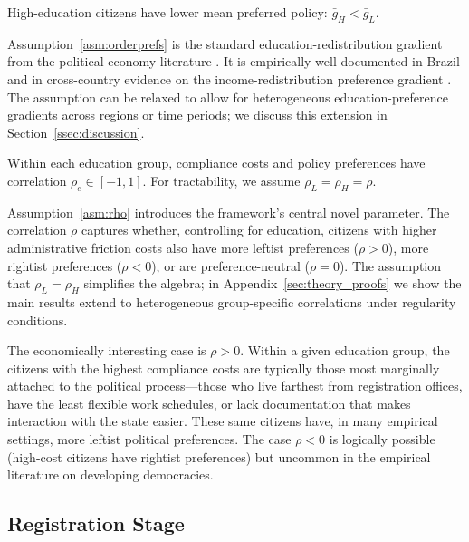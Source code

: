 \begin{assumption}
\label{asm:orderprefs}
High-education citizens have lower mean preferred policy: $\bar g_H < \bar g_L$.
\end{assumption}

Assumption~\ref{asm:orderprefs} is the standard education-redistribution gradient from the political economy literature \citep{Meltzer1981RationalTheoryThe}. It is empirically well-documented in Brazil \citep{Hunter2010, Soares2011} and in cross-country evidence on the income-redistribution preference gradient \citep{Alesina2018IntergenMobilityAnd}. The assumption can be relaxed to allow for heterogeneous education-preference gradients across regions or time periods; we discuss this extension in Section~\ref{ssec:discussion}.

\begin{assumption}
\label{asm:rho}
Within each education group, compliance costs and policy preferences have correlation $\rho_e \in [-1, 1]$. For tractability, we assume $\rho_L = \rho_H = \rho$.
\end{assumption}

Assumption~\ref{asm:rho} introduces the framework's central novel parameter. The correlation $\rho$ captures whether, controlling for education, citizens with higher administrative friction costs also have more leftist preferences ($\rho > 0$), more rightist preferences ($\rho < 0$), or are preference-neutral ($\rho = 0$). The assumption that $\rho_L = \rho_H$ simplifies the algebra; in Appendix~\ref{sec:theory_proofs} we show the main results extend to heterogeneous group-specific correlations under regularity conditions.

The economically interesting case is $\rho > 0$. Within a given education group, the citizens with the highest compliance costs are typically those most marginally attached to the political process---those who live farthest from registration offices, have the least flexible work schedules, or lack documentation that makes interaction with the state easier. These same citizens have, in many empirical settings, more leftist political preferences. The case $\rho < 0$ is logically possible (high-cost citizens have rightist preferences) but uncommon in the empirical literature on developing democracies.

\subsection{Registration Stage}
\label{ssec:registration}

